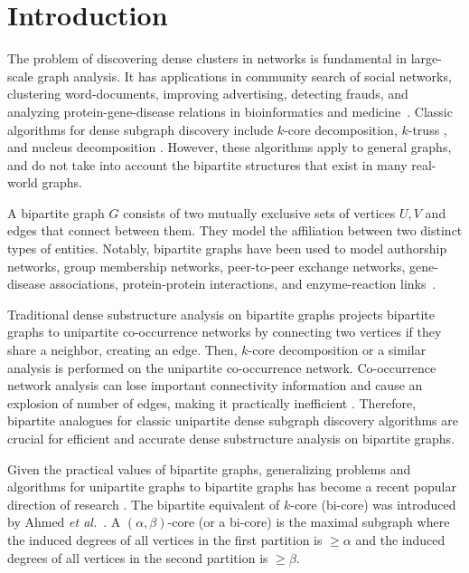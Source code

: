 \section{Introduction}




The problem of discovering dense clusters in networks is fundamental in large-scale graph analysis. It has applications in community search of social networks, clustering word-documents, improving advertising, detecting frauds, and analyzing protein-gene-disease relations in bioinformatics and medicine~\cite{Pavlopoulos2016,Sariyuce2017}. Classic algorithms for dense subgraph discovery include $k$-core \cite{MaBe83} decomposition, $k$-truss \cite{Cohen08}, and nucleus decomposition \cite{SariyuceP18}. However, these algorithms apply to general graphs, and do not take into account the bipartite structures that exist in many real-world graphs.

A bipartite graph $G$ consists of two mutually exclusive sets of vertices $U,V$ and edges that connect between them. They model the affiliation between two distinct types of entities. Notably, bipartite graphs have been used to model authorship networks, group membership networks, peer-to-peer exchange networks, gene-disease associations, protein-protein interactions, and enzyme-reaction links~\cite{Pavlopoulos2016, Algarra2013, Fionda2007, Fang2019survey, watts1998cds}.

Traditional dense substructure analysis on bipartite graphs projects bipartite graphs to unipartite co-occurrence networks by connecting two vertices if they share a neighbor, creating an edge. Then, $k$-core decomposition or a similar analysis is performed on the unipartite co-occurrence network. Co-occurrence network analysis can lose important connectivity information and cause an explosion of number of edges, making it practically inefficient \cite{Sariyuce2017}. Therefore, bipartite analogues for classic unipartite dense subgraph discovery algorithms are crucial for efficient and accurate dense substructure analysis on bipartite graphs. 

Given the practical values of bipartite graphs, generalizing problems and algorithms for unipartite graphs to bipartite graphs has become a recent popular direction of research \cite{WangLin21,AhmedBat07,ZouZhao16,SaPi18}. The bipartite equivalent of $k$-core (bi-core) was introduced by Ahmed \textit{et al.}~\cite{AhmedBat07}. A $(\alpha,\beta)$-core (or a bi-core) is the maximal subgraph where the induced degrees of all vertices in the first partition is $\ge \alpha$ and the induced degrees of all vertices in the second partition is $\ge \beta$.

